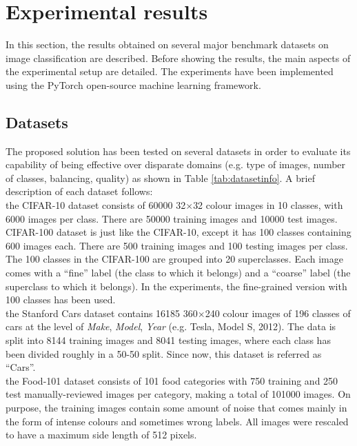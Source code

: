 \documentclass[review]{elsarticle}
\begin{document}
\section{Experimental results}\label{sec:results}
In this section, the results obtained on several major benchmark datasets on image classification are described. Before showing the results, the main aspects of the experimental setup are detailed. The experiments have been implemented using the PyTorch \cite{NEURIPS2019_9015} open-source machine learning framework.

\subsection{Datasets}
The proposed solution has been tested on several datasets in order to evaluate its capability of being effective over disparate domains (e.g. type of images, number of classes, balancing, quality) as shown in Table \ref{tab:datasetinfo}.
A brief description of each dataset follows:\\

 the CIFAR-10 dataset consists of 60000 32$\times$32 colour images in 10 classes, with 6000 images per class. There are 50000 training images and 10000 test images. CIFAR-100 dataset is just like the CIFAR-10, except it has 100 classes containing 600 images each. There are 500 training images and 100 testing images per class. The 100 classes in the CIFAR-100 are grouped into 20 superclasses. Each image comes with a ``fine'' label (the class to which it belongs) and a ``coarse'' label (the superclass to which it belongs). In the experiments, the fine-grained version with 100 classes has been used.\\

 the Stanford Cars dataset contains 16185 360$\times$240 colour images of 196 classes of cars at the level of \emph{Make}, \emph{Model}, \emph{Year} (e.g. Tesla, Model S, 2012). The data is split into 8144 training images and 8041 testing images, where each class has been divided roughly in a 50-50 split. Since now, this dataset is referred as ``Cars''.\\

 the Food-101 dataset consists of 101 food categories with 750 training and 250 test manually-reviewed images per category, making a total of 101000 images. On purpose, the training images contain some amount of noise that comes mainly in the form of intense colours and sometimes wrong labels. All images were rescaled to have a maximum side length of 512 pixels. \\
\end{document}
